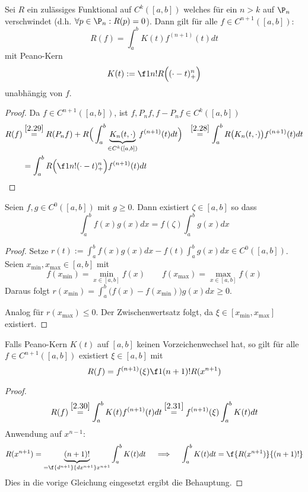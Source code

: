 \documentclass[11pt]{scrbook}
\begin{document}
\begin{st}
	\label{2.30}
	Sei $R$ ein zulässiges Funktional auf $C^k([a,b])$ welches für ein $n>k$ auf $\P_n$ verschwindet (d.h. $\forall p\in \P_n : R(p)=0$).
	Dann gilt für alle $f\in C^{n+1}([a,b])$:
	\[
		R(f) = \int_a^b K(t) f^{(n+1)}(t) dt
	\]
	mit Peano-Kern 
	\[
		K(t) := \f 1{n!}R\Big((\cdot - t)^n_+\Big)
	\]
	unabhängig von $f$.
	\begin{proof}
		Da $f\in C^{n+1}([a,b])$, ist $f,P_nf,f-P_nf \in C^k([a,b])$
		\begin{align*}
			R(f) &\stackrel{\ref{2.29}}= R(P_n f) + R \Big( \int_a^b \underbrace{K_n(t,\cdot)}_{\in C^k([a,b])} f^{(n+1)}(t) dt \Big)
			&\stackrel{\ref{2.28}} =  \int_a^b R\big(K_n(t,\cdot)\big) f^{(n+1)}(t) dt \\
			&= \int_a^b R \Big( \f 1{n!}(\cdot - t)^n_+ \Big) f^{(n+1)}(t) dt
		\end{align*}
	\end{proof}
\end{st}

\begin{lem} \label{2.31}
	Seien $f,g \in C^0([a,b])$ mit $g\ge 0$.
	Dann existiert $\zeta \in [a,b]$ so dass
	\[
		\int_a^b f(x) g(x) dx = f(\zeta) \int_a^b g(x) dx
	\]
	\begin{proof}
		Setze $r(t) := \int_a^b f(x)g(x) dx - f(t) \int_a^b g(x) dx \in C^0([a,b])$.
		Seien $x_{\text{min}}, x_{\text{max}} \in [a,b]$ mit
		\[
			f(x_{\text{min}}) = \min_{x\in[a,b]} f(x)
			\qquad
			f(x_{\text{max}}) = \max_{x\in[a,b]} f(x)
		\]
		Daraus folgt $r(x_{\text{min}}) = \int_a^b \big(f(x)-f(x_{\text{min}})\big)g(x) dx \ge 0$.

		Analog für $r(x_{\text{max}}) \le 0$.
		Der Zwischenwertsatz folgt, da $\xi \in[x_{\text{min}}, x_{\text{max}}]$ existiert.
	\end{proof}
\end{lem}

\begin{kor} \label{2.32}
	Falls Peano-Kern $K(t)$ auf $[a,b]$ keinen Vorzeichenwechsel hat, so gilt für alle $f\in C^{n+1}([a,b])$ existiert $\xi\in [a,b]$ mit
	\[
		R(f) = f^{(n+1)}(\xi) \f 1{(n+1)!} R(x^{n+1})
	\]
	\begin{proof}
		\[
			R(f) \stackrel{\ref{2.30}}= \int_a^b K(t) f^{(n+1)}(t) dt 
			\stackrel{\ref{2.31}}= f^{(n+1)}(\xi)\int_a^b K(t) dt
		\]
		Anwendung auf $x^{n-1}$:
		\[
			R(x^{n+1}) = \underbrace{(n+1)!}_{=\f {d^{n+1}}{dx^{n+1}}x^{n+1}} \int_a^b K(t) dt \quad 
			\implies \quad \int_a^b K(t) dt = \f {R(x^{n+1})}{(n+1)!}
		\]
		Dies in die vorige Gleichung eingesetzt ergibt die Behauptung.
	\end{proof}
\end{kor}
\end{document}

